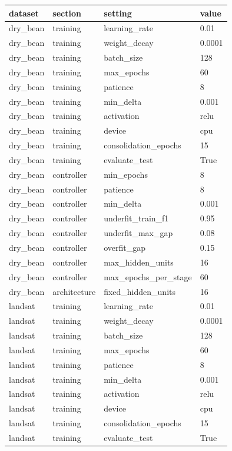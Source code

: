 \begin{tabular}{llll}
\toprule
dataset & section & setting & value \\
\midrule
dry\_bean & training & learning\_rate & 0.01 \\
dry\_bean & training & weight\_decay & 0.0001 \\
dry\_bean & training & batch\_size & 128 \\
dry\_bean & training & max\_epochs & 60 \\
dry\_bean & training & patience & 8 \\
dry\_bean & training & min\_delta & 0.001 \\
dry\_bean & training & activation & relu \\
dry\_bean & training & device & cpu \\
dry\_bean & training & consolidation\_epochs & 15 \\
dry\_bean & training & evaluate\_test & True \\
dry\_bean & controller & min\_epochs & 8 \\
dry\_bean & controller & patience & 8 \\
dry\_bean & controller & min\_delta & 0.001 \\
dry\_bean & controller & underfit\_train\_f1 & 0.95 \\
dry\_bean & controller & underfit\_max\_gap & 0.08 \\
dry\_bean & controller & overfit\_gap & 0.15 \\
dry\_bean & controller & max\_hidden\_units & 16 \\
dry\_bean & controller & max\_epochs\_per\_stage & 60 \\
dry\_bean & architecture & fixed\_hidden\_units & 16 \\
landsat & training & learning\_rate & 0.01 \\
landsat & training & weight\_decay & 0.0001 \\
landsat & training & batch\_size & 128 \\
landsat & training & max\_epochs & 60 \\
landsat & training & patience & 8 \\
landsat & training & min\_delta & 0.001 \\
landsat & training & activation & relu \\
landsat & training & device & cpu \\
landsat & training & consolidation\_epochs & 15 \\
landsat & training & evaluate\_test & True \\

\end{tabular}

